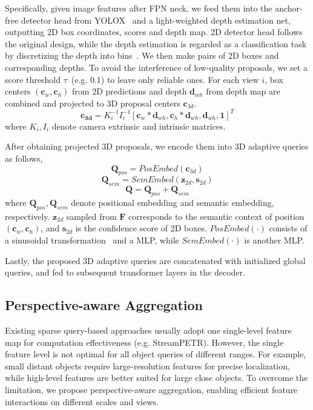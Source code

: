 \documentclass[letterpaper]{article} \usepackage{aaai24}
\begin{document}
Specifically, given image features after FPN neck, we feed them into the anchor-free detector head from YOLOX~\cite{ge2021yolox} and a light-weighted depth estimation net, outputting 2D box coordinates, scores and depth map.
2D detector head follows the original design, while the depth estimation is regarded as a classification task by discretizing the depth into bins~\cite{reading2021categorical, zhang2022monodetr}.
We then make pairs of 2D boxes and corresponding depths. To avoid the interference of low-quality proposals, we set a score threshold $\tau$~(e.g. 0.1) to leave only reliable ones. For each view $i$, box centers $(\mathbf{c}_w, \mathbf{c}_h)$ from 2D predictions and depth $\mathbf{d}_{wh}$ from depth map are combined and projected to 3D proposal centers $\mathbf{c}_{3d}$.
\begin{equation}
    \mathbf{c_{3d}} = \mathit{K_{i}^{-1}I_{i}^{-1}}[\mathbf{c}_w*\mathbf{d}_{wh}, \mathbf{c}_h*\mathbf{d}_{wh}, \mathbf{d}_{wh}, \mathbf{1}]^{T}
\end{equation}
where $\mathit{K_{i}, I_{i}}$ denote camera extrinsic and intrinsic matrices.

After obtaining projected 3D proposals, we encode them into 3D adaptive queries as follows,
\begin{equation}
    \mathbf{Q}_{pos} = \mathit{PosEmbed}(\mathbf{c}_{3d})
\end{equation}
\begin{equation}
    \mathbf{Q}_{sem} = \mathit{SemEmbed}(\mathbf{z}_{2d}, \mathbf{s}_{2d})
\end{equation}
\begin{equation}
    \mathbf{Q} = \mathbf{Q}_{pos} + \mathbf{Q}_{sem}
\end{equation}
where $\mathbf{Q}_{pos}, \mathbf{Q}_{sem}$ denote positional embedding and semantic embedding, respectively. $\mathbf{z}_{2d}$ sampled from $\mathbf{F}$ corresponds to the semantic context of position $(\mathbf{c}_w, \mathbf{c}_h)$, and $\mathbf{s}_{2d}$ is the confidence score of 2D boxes. $\mathit{PosEmbed(\cdot)}$ consists of a sinusoidal transformation~\cite{vaswani2017attention} and a MLP, while $\mathit{SemEmbed(\cdot)}$ is another MLP. 

Lastly, the proposed 3D adaptive queries are concatenated with initialized global queries, and fed to subsequent transformer layers in the decoder. 

\subsection{Perspective-aware Aggregation}
Existing sparse query-based approaches usually adopt one single-level feature map for computation effectiveness (e.g. StreamPETR). However, the single feature level is not optimal for all object queries of different ranges. For example, small distant objects require large-resolution features for precise localization, while high-level features are better suited for large close objects.
To overcome the limitation, we propose perspective-aware aggregation, enabling efficient feature interactions on different scales and views. 
\end{document}
